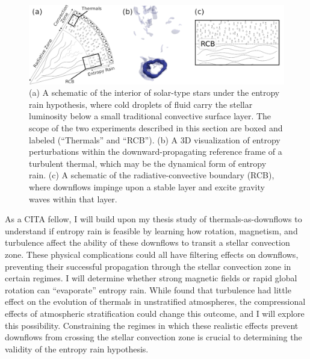 \documentclass[preprint, hmargin=1in, vmargin=1in]{aastex62}
\begin{document}
\begin{figure}[t]
    \includegraphics[width=\textwidth]{./figs/tri_panel.png}
    \caption{ (a) A schematic of the interior of solar-type stars under the entropy rain hypothesis, where cold droplets of fluid carry the stellar luminosity below a small traditional convective surface layer.
	The scope of the two experiments described in this section are boxed and labeled (``Thermals'' and ``RCB'').
	(b) A 3D visualization of entropy perturbations within the downward-propagating reference frame of a turbulent thermal, which may be the dynamical form of entropy rain.
	(c) A schematic of the radiative-convective boundary (RCB), where downflows impinge upon a stable layer and excite gravity waves within that layer.
	\label{fig:tri_panel} }
\end{figure}


%
As a CITA fellow, I will build upon my thesis study of thermals-as-downflows \citep{andersLB2019} to understand if entropy rain is feasible by learning how rotation, magnetism, and turbulence affect the ability of these downflows to transit a stellar convection zone.
These physical complications could all have filtering effects on downflows, preventing their successful propagation through the stellar convection zone in certain regimes.
I will determine whether strong magnetic fields or rapid global rotation can ``evaporate'' entropy rain.
While \citet{lecoanet&jeevanjee2019} found that turbulence had little effect on the evolution of thermals in unstratified atmospheres, the compressional effects of atmospheric stratification could change this outcome, and I will explore this possibility.
Constraining the regimes in which these realistic effects prevent downflows from crossing the stellar convection zone is crucial to determining the validity of the entropy rain hypothesis.
\end{document}
